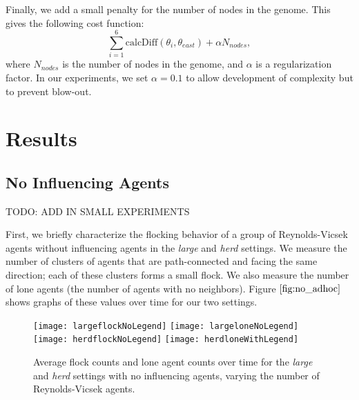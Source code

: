 Finally, we add a small penalty for the number of nodes in the genome.
This gives the following cost function:
\[ \sum_{i=1}^6 \text{calcDiff}(\theta_i, \theta_{east}) + \alpha N_{nodes}, \]
where $N_{nodes}$ is the number of nodes in the genome, and $\alpha$ is a
regularization factor.
In our experiments, we set $\alpha=0.1$ to allow development of complexity but
to prevent blow-out.

\section{Results}
\subsection{No Influencing Agents}
TODO: ADD IN SMALL EXPERIMENTS 

First, we briefly characterize the flocking behavior of a group of Reynolds-Vicsek
agents without influencing agents in the \textit{large} and \textit{herd} settings.
We measure the number of clusters of agents that are path-connected and facing the
same direction; each of these clusters forms a small flock.
We also measure the number of lone agents (the number of agents with no neighbors).
Figure $\ref{fig:no_adhoc}$ shows graphs of these values over time for our two
settings.
\begin{figure}
    \centering
    \texttt{[image: largeflockNoLegend]}
    \texttt{[image: largeloneNoLegend]}
    \texttt{[image: herdflockNoLegend]}
    \texttt{[image: herdloneWithLegend]}
    \caption{Average flock counts and lone agent counts over time for the
    \textit{large} and \textit{herd} settings with no influencing agents,
    varying the number of Reynolds-Vicsek agents.}
    \label{fig:no_adhoc}
\end{figure}

